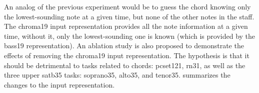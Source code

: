 
An analog of the previous experiment would be to guess the
chord knowing only the lowest-sounding note at a given time,
but none of the other notes in the staff. The \gls{chroma19}
input representation provides all the note information at a
given time, without it, only the lowest-sounding one is
known (which is provided by the \gls{bass19}
representation). An ablation study is also proposed to
demonstrate the effects of removing the \gls{chroma19} input
representation. The hypothesis is that it should be
detrimental to tasks related to chords: \gls{pcset121},
\gls{rn31}, as well as the three upper \gls{satb35} tasks:
\gls{soprano35}, \gls{alto35}, and \gls{tenor35}.
 summarizes the changes to the input
representation.


